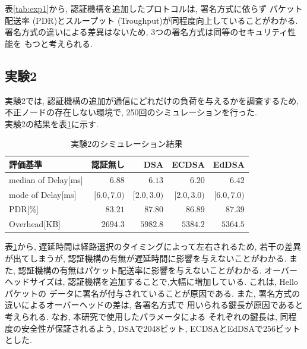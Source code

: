 \documentclass[a4j,9pt,twocolumn]{jsarticle}
\begin{document}
表\ref{tab:exp1}から, 認証機構を追加したプロトコルは, 署名方式に依らず
パケット配送率 (PDR)とスループット (Troughput)が同程度向上していることがわかる. 
署名方式の違いによる差異はないため, 3つの署名方式は同等のセキュリティ性能を
もつと考えられる. 
\smallskip
\subsection{実験2}
\indent 実験2では, 認証機構の追加が通信にどれだけの負荷を与えるかを調査するため, 
不正ノードの存在しない環境で, 250回のシミュレーションを行った. \\
\indent 実験2の結果を表\ref{tab:exp2}に示す. 
\vspace{-3mm}
\begin{table}[h]
    \centering
    \caption{実験2のシミュレーション結果}
    \label{tab:exp2} 
    \begin{tabular}{l|rrrr} \hline
        評価基準 & 認証無し & DSA & ECDSA & EdDSA \\ \hline \hline
        \footnotesize{median of Delay[ms]} & $6.88$ & $6.13$ & $6.20$ & $6.42$ \\
        \small{mode of Delay[ms]} & $[6.0, 7.0)$ & $[2.0, 3.0)$ & $[2.0, 3.0)$ & $[6.0, 7.0)$ \\
        PDR[\%] & $83.21$ & $87.80$ & $86.89$ & $87.39$ \\
        Overhead[KB] & $2694.3$ & $5982.8$ & $5384.2$ & $5364.5$ \\ \hline
    \end{tabular}
\end{table}

表\ref{tab:exp2}から, 遅延時間は経路選択のタイミングによって左右されるため, 
若干の差異が出てしまうが, 認証機構の有無が遅延時間に影響を与えないことがわかる. 
また, 認証機構の有無はパケット配送率に影響を与えないことがわかる. 
オーバーヘッドサイズは, 認証機構を追加することで,大幅に増加している. これは, Helloパケットの
データに署名が付与されていることが原因である. また, 署名方式の違いによるオーバーヘッドの差は, 各署名方式で
用いられる鍵長が原因であると考えられる. なお, 本研究で使用したパラメータによる
それぞれの鍵長は, 同程度の安全性が保証されるよう, DSAで2048ビット, ECDSAとEdDSAで256ビットとした. 
\end{document}

